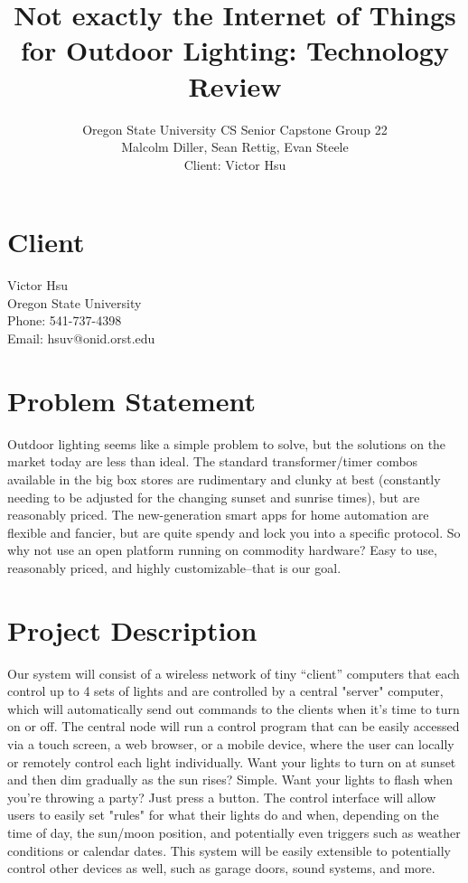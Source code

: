 \documentclass[12pt]{article}
\title{Not exactly the Internet of Things for Outdoor Lighting: Technology Review}
\author{Oregon State University CS Senior Capstone Group 22\\Malcolm Diller, Sean Rettig, Evan Steele\\Client: Victor Hsu}
\begin{document}
 

\maketitle

\pagebreak

\section{Client}

Victor Hsu\\
Oregon State University\\
Phone: 541-737-4398\\
Email: hsuv@onid.orst.edu

\section{Problem Statement}

Outdoor lighting seems like a simple problem to solve, but the solutions on the
market today are less than ideal.  The standard transformer/timer combos
available in the big box stores are rudimentary and clunky at best (constantly
needing to be adjusted for the changing sunset and sunrise times), but are
reasonably priced. The new-generation smart apps for home automation are
flexible and fancier, but are quite spendy and lock you into a specific
protocol.  So why not use an open platform running on commodity hardware?  Easy
to use, reasonably priced, and highly customizable--that is our goal. \\

\section{Project Description}

Our system will consist of a wireless network of tiny “client” computers that
each control up to 4 sets of lights and are controlled by a central "server"
computer, which will automatically send out commands to the clients when it's
time to turn on or off.  The central node will run a control program that can
be easily accessed via a touch screen, a web browser, or a mobile device, where
the user can locally or remotely control each light individually.  Want your
lights to turn on at sunset and then dim gradually as the sun rises?  Simple.
Want your lights to flash when you're throwing a party?  Just press a button.
The control interface will allow users to easily set "rules" for what their
lights do and when, depending on the time of day, the sun/moon position, and
potentially even triggers such as weather conditions or calendar dates.  This
system will be easily extensible to potentially control other devices as well,
such as garage doors, sound systems, and more. \\
\hypersetup{linkcolor=blue}
\end{document}
